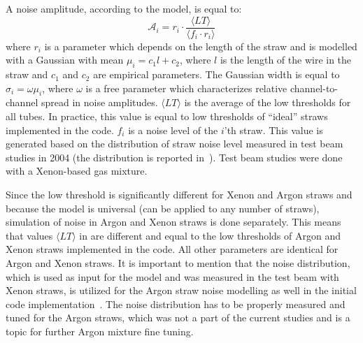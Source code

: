 

A noise amplitude, according to the model, is equal to:
\begin{equation}
 \mathcal A_{i} = r_{i} \cdot \dfrac{\langle LT \rangle}{\langle f_i \cdot r_i \rangle}
 \label{eq:ampl_noise}
\end{equation}
where $r_{i}$ is a parameter which depends on the length of the straw and is modelled with a Gaussian with mean $\mu_i = c_1 l + c_2$, 
where $l$ is the length of the wire in the straw and $c_1$ and $c_2$ are empirical parameters.
The Gaussian width is equal to $\sigma_i = \omega \mu_i$, where $\omega$ is a free parameter which characterizes
relative channel-to-channel spread in noise amplitudes.
$\langle LT \rangle$ is the average of the low thresholds for all tubes. In practice, this value is equal to low thresholds of ``ideal'' straws 
implemented in the code.
$f_{i}$ is a noise level of the $i$'th straw. This value is generated based on the distribution of straw noise level measured in test beam studies in 2004 
(the distribution is reported in~\cite{kittelmann_thesis}).
Test beam studies were done with a Xenon-based gas mixture. 

Since the low threshold is significantly different for Xenon and Argon straws and because the model is universal (can be applied to any number of straws), 
simulation of noise in Argon and Xenon straws is done separately. This means that values $\langle LT \rangle$ in  are 
different and equal to the low thresholds of Argon and Xenon straws implemented in the code. All other parameters are identical for Argon and Xenon straws.
It is important to mention that the noise distribution, which is used as input for the model and was measured in the test beam with Xenon straws,
is utilized for the Argon straw noise modelling as well in the initial code implementation~\cite{anatoli_private_communication}. 
The noise distribution has to be properly measured and tuned for the Argon straws, which
was not a part of the current studies and is a topic for further Argon mixture fine tuning.


